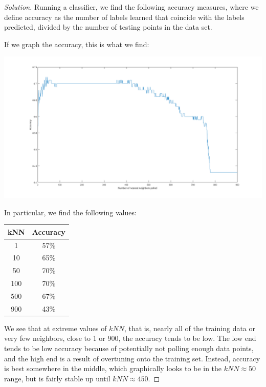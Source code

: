 \documentclass[10pt]{article}
\begin{document}
\begin{proof}[Solution]

Running a classifier, we find the following accuracy measures, where we define accuracy as the number of labels learned that coincide with the labels predicted, divided by the number of testing points in the data set.

If we graph the accuracy, this is what we find:

\begin{center}
\includegraphics[width=\linewidth]{knn_synthetic_data_accuracy}
\end{center}

In particular, we find the following values:

\begin{center}
\begin{tabular}{|| c| c||}
\hline
kNN & Accuracy \\

\hline \hline
1 & 57\% \\ \hline
10 & 65\% \\ \hline
50 & 70\% \\ \hline
100 & 70\% \\ \hline
500 & 67\% \\ \hline
900 &  43\% \\ \hline
\end{tabular}
\end{center}

We see that at extreme values of $kNN$, that is, nearly all of the training data or very few neighbors, close to 1 or 900, the accuracy tends to be low. The low end tends to be low accuracy because of potentially not polling enough data points, and the high end is a result of overtuning onto the training set. Instead, accuracy is best somewhere in the middle, which graphically looks to be in the $kNN \approx 50$ range, but is fairly stable up until $kNN \approx 450$.


\end{proof}
\end{document}
